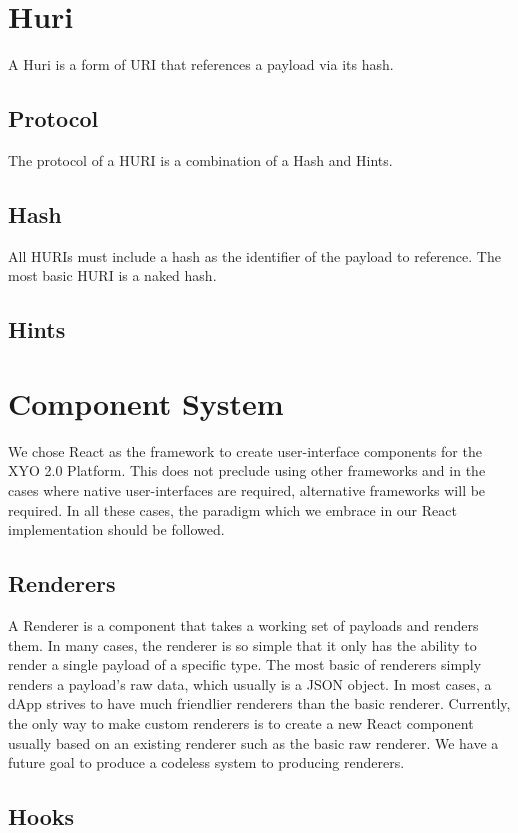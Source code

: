 \documentclass{article}
\begin{document}
\section{Huri}
A Huri is a form of URI that references a payload via its hash.
\subsection{Protocol}
The protocol of a HURI is a combination of a Hash and Hints.
\subsection{Hash}
All HURIs must include a hash as the identifier of the payload to reference. The most basic HURI is a naked hash.
\subsection{Hints}

\section{Component System}
We chose React as the framework to create user-interface components for the XYO 2.0 Platform.  This does not preclude using other frameworks and in the cases where native user-interfaces are required, alternative frameworks will be required.  In all these cases, the paradigm which we embrace in our React implementation should be followed.

\subsection{Renderers}
A Renderer is a component that takes a working set of payloads and renders them.  In many cases, the renderer is so simple that it only has the ability to render a single payload of a specific type.  The most basic of renderers simply renders a payload's raw data, which usually is a JSON object.  In most cases, a dApp strives to have much friendlier renderers than the basic renderer.  Currently, the only way to make custom renderers is to create a new React component usually based on an existing renderer such as the basic raw renderer.  We have a future goal to produce a codeless system to producing renderers.

\subsection{Hooks}
\end{document}
